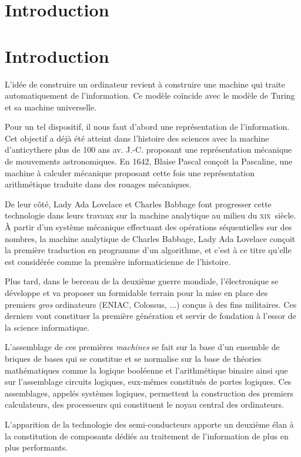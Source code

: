 \documentclass[a4paper,11pt]{book}
\begin{document}
\ifstandalone{}
    \chapter*{Introduction}
\else{}
    \chapter{Introduction}
\fi
L'idée de construire un ordinateur revient à construire une machine qui traite automatiquement de l'information. Ce modèle coïncide avec le modèle de Turing et sa machine universelle. 

Pour un tel dispositif, il nous faut d'abord une représentation de l'information. Cet objectif a déjà été atteint dans l'histoire des sciences avec la machine d'anticythere plus de 100 ans av. J.-C. proposant une représentation mécanique de mouvements astronomiques. En 1642, Blaise Pascal conçoit la Pascaline, une machine à calculer mécanique proposant cette fois une représentation arithmétique traduite dans des rouages mécaniques.

De leur côté, Lady Ada Lovelace et Charles Babbage font progresser cette technologie dans leurs travaux sur la machine analytique au milieu du \textsc{xix}\ieme ~siècle. À partir d'un système mécanique effectuant des opérations séquentielles sur des nombres, la machine analytique de Charles Babbage, Lady Ada Lovelace conçoit la première traduction en programme d'un algorithme, et c'est à ce titre qu'elle est considérée comme la première informaticienne de l'histoire.

Plus tard, dans le berceau de la deuxième guerre mondiale, l'électronique se développe et va proposer un formidable terrain pour la mise en place des premiers \textit{gros}
ordinateurs (ENIAC, Colossus, ...) conçus à des fins militaires. Ces derniers vont constituer la première génération et servir de fondation à l'essor de la science informatique.

L'assemblage de ces premières \textit{machines} se fait sur la base d'un ensemble de briques de bases qui se constitue et se normalise sur la base de théories mathématiques comme la logique booléenne et l'arithmétique binaire ainsi que sur l'assemblage circuits logiques, eux-mêmes constitués de portes logiques. Ces assemblages, appelés systèmes logiques, permettent la construction des premiers calculateurs, des processeurs qui constituent le noyau central des ordinateurs.

L'apparition de la technologie des semi-conducteurs apporte un deuxième élan à la constitution de composants dédiés au traitement de l'information de plus en plus performants.
\end{document}
